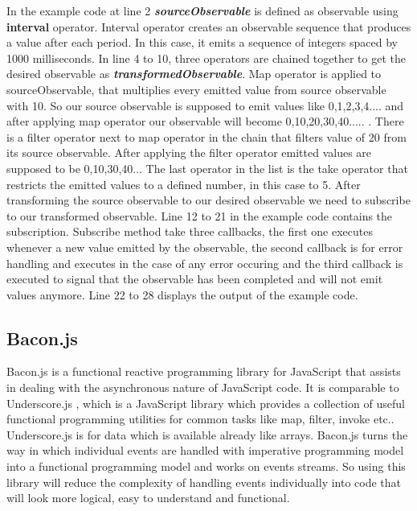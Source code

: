 In the example code at line 2 \textbf{\textit{sourceObservable}} is defined as observable using \textbf{interval} operator. Interval operator creates an observable sequence that produces a value after each period. In this case, it emits a sequence of integers spaced by 1000 milliseconds. In line 4 to 10, three operators are chained together to get the desired observable as \textbf{\textit{transformedObservable}}. Map operator is applied to sourceObservable, that multiplies every emitted value from source observable with 10. So our source observable is supposed to emit values like 0,1,2,3,4.... and after applying map operator our observable will become 0,10,20,30,40..... . There is a filter operator next to map operator in the chain that filters value of 20 from its source observable. After applying the filter operator emitted values are supposed to be 0,10,30,40... The last operator in the list is the take operator that restricts the emitted values to a defined number, in this case to 5.
After transforming the source observable to our desired observable we need to subscribe to our transformed observable. Line 12 to 21 in the example code contains the subscription. Subscribe method take three callbacks, the first one executes whenever a new value emitted by the observable, the second callback is for error handling and executes in the case of any error occuring and the third callback is executed to signal that the observable has been completed and will not emit values anymore. Line 22 to 28 displays the output of the example code.


\subsection{Bacon.js}
Bacon.js is a functional reactive programming library for JavaScript that assists in dealing with the asynchronous nature of JavaScript code. It is comparable to Underscore.js \cite{Underscorejs}, which is a JavaScript library which provides a collection of useful functional programming utilities for common tasks like map, filter, invoke etc..
Underscore.js is for data which is available already like arrays. Bacon.js turns the way  in which individual events are handled with imperative programming model into a functional programming model and works on events streams. So using this library will reduce the complexity of handling events individually into code that will look more logical, easy to understand and functional.

